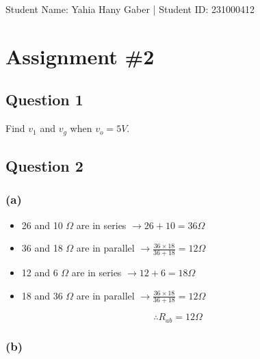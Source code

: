 \documentclass[11pt]{article}
\author{Yahia Gaber}
\date{\today}
\title{}
\begin{document}
\tableofcontents

Student Name: Yahia Hany Gaber |
Student ID: 231000412
\section{Assignment \#2}
\label{sec:org63269cc}

\subsection{Question 1}
\label{sec:org3e6dd82}

Find \(v_1\) and \(v_g\) when \(v_o = 5V\).
\subsection{Question 2}
\label{sec:orgbc8c09a}

\subsubsection{(a)}
\label{sec:org4c67fcd}

\begin{itemize}
\item 26 and 10 \(\Omega\) are in series \(\to 26 + 10 = 36 \Omega\)

\item 36 and 18 \(\Omega\) are in parallel \(\to \frac{36 \times 18}{36 + 18} = 12 \Omega\)

\item 12 and 6 \(\Omega\) are in series \(\to 12 + 6 = 18 \Omega\)

\item 18 and 36 \(\Omega\) are in parallel \(\to \frac{36 \times 18}{36 + 18} = 12 \Omega\)
\end{itemize}

$$\therefore \boxed{R_{ab} = 12 \Omega}$$
\subsubsection{(b)}
\label{sec:org2cbb0b4}
\end{document}

